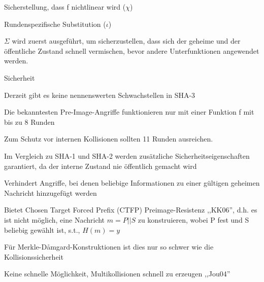 \documentclass[a4paper]{article}
\begin{document}
\begin{multicols}{3}
\begin{itemize*}
\begin{itemize*}
\begin{itemize*}
                        \item Sicherstellung, dass f nichtlinear wird ($\chi$)
                        \item Rundenspezifische Substitution ($\iota$)
                  \end{itemize*}
            \end{itemize*}
            \item $\Sigma$ wird zuerst ausgeführt, um sicherzustellen,
            dass sich der geheime und der öffentliche Zustand schnell vermischen,
            bevor andere Unterfunktionen angewendet werden.
            \item Sicherheit
            \begin{itemize*}
                  \item Derzeit gibt es keine nennenswerten Schwachstellen in SHA-3
                  \begin{itemize*}
                        \item Die bekanntesten Pre-Image-Angriffe funktionieren nur mit einer Funktion f mit bis zu 8 Runden
                        \item Zum Schutz vor internen Kollisionen sollten 11 Runden ausreichen.
                  \end{itemize*}
                  \item Im Vergleich zu SHA-1 und SHA-2 werden zusätzliche Sicherheitseigenschaften garantiert, da der interne Zustand nie öffentlich gemacht wird
                  \begin{itemize*}
                        \item Verhindert Angriffe, bei denen beliebige Informationen zu einer gültigen geheimen Nachricht hinzugefügt werden
                        \item Bietet Chosen Target Forced Prefix (CTFP) Preimage-Resistenz ,,KK06'', d.h. es ist nicht möglich, eine Nachricht $m=P|| S$ zu konstruieren, wobei P fest und S beliebig gewählt ist, s.t., $H(m)=y$
                        \item Für Merkle-Dåmgard-Konstruktionen ist dies nur so schwer wie die Kollisionssicherheit
                        \item Keine schnelle Möglichkeit, Multikollisionen schnell zu erzeugen ,,Jou04''
                  \end{itemize*}
            \end{itemize*}
      \end{itemize*}



\end{multicols}
\end{document}
